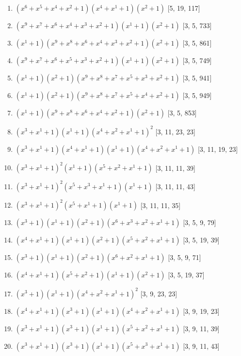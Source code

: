 \documentclass[10pt,twocolumn]{article}
\begin{document}
\begin{enumerate}
\item $(x^{6} + x^{5} + x^{4} + x^{2} + 1)(x^{4} + x^{1} + 1)(x^{2} + 1)$  [5, 19, 117]
\item $(x^{9} + x^{7} + x^{6} + x^{4} + x^{3} + x^{2} + 1)(x^{1} + 1)(x^{2} + 1)$  [3, 5, 733]
\item $(x^{1} + 1)(x^{9} + x^{8} + x^{6} + x^{4} + x^{3} + x^{2} + 1)(x^{2} + 1)$  [3, 5, 861]
\item $(x^{9} + x^{7} + x^{6} + x^{5} + x^{3} + x^{2} + 1)(x^{1} + 1)(x^{2} + 1)$  [3, 5, 749]
\item $(x^{1} + 1)(x^{2} + 1)(x^{9} + x^{8} + x^{7} + x^{5} + x^{3} + x^{2} + 1)$  [3, 5, 941]
\item $(x^{1} + 1)(x^{2} + 1)(x^{9} + x^{8} + x^{7} + x^{5} + x^{4} + x^{2} + 1)$  [3, 5, 949]
\item $(x^{1} + 1)(x^{9} + x^{8} + x^{6} + x^{4} + x^{2} + 1)(x^{2} + 1)$  [3, 5, 853]
\item $(x^{3} + x^{1} + 1)(x^{1} + 1)(x^{4} + x^{2} + x^{1} + 1)^{2}$  [3, 11, 23, 23]
\item $(x^{3} + x^{1} + 1)(x^{4} + x^{1} + 1)(x^{1} + 1)(x^{4} + x^{2} + x^{1} + 1)$  [3, 11, 19, 23]
\item $(x^{3} + x^{1} + 1)^{2}(x^{1} + 1)(x^{5} + x^{2} + x^{1} + 1)$  [3, 11, 11, 39]
\item $(x^{3} + x^{1} + 1)^{2}(x^{5} + x^{3} + x^{1} + 1)(x^{1} + 1)$  [3, 11, 11, 43]
\item $(x^{3} + x^{1} + 1)^{2}(x^{5} + x^{1} + 1)(x^{1} + 1)$  [3, 11, 11, 35]
\item $(x^{3} + 1)(x^{1} + 1)(x^{2} + 1)(x^{6} + x^{3} + x^{2} + x^{1} + 1)$  [3, 5, 9, 79]
\item $(x^{4} + x^{1} + 1)(x^{1} + 1)(x^{2} + 1)(x^{5} + x^{2} + x^{1} + 1)$  [3, 5, 19, 39]
\item $(x^{3} + 1)(x^{1} + 1)(x^{2} + 1)(x^{6} + x^{2} + x^{1} + 1)$  [3, 5, 9, 71]
\item $(x^{4} + x^{1} + 1)(x^{5} + x^{2} + 1)(x^{1} + 1)(x^{2} + 1)$  [3, 5, 19, 37]
\item $(x^{3} + 1)(x^{1} + 1)(x^{4} + x^{2} + x^{1} + 1)^{2}$  [3, 9, 23, 23]
\item $(x^{4} + x^{1} + 1)(x^{3} + 1)(x^{1} + 1)(x^{4} + x^{2} + x^{1} + 1)$  [3, 9, 19, 23]
\item $(x^{3} + x^{1} + 1)(x^{3} + 1)(x^{1} + 1)(x^{5} + x^{2} + x^{1} + 1)$  [3, 9, 11, 39]
\item $(x^{3} + x^{1} + 1)(x^{3} + 1)(x^{1} + 1)(x^{5} + x^{3} + x^{1} + 1)$  [3, 9, 11, 43]

\end{enumerate}
\end{document}
